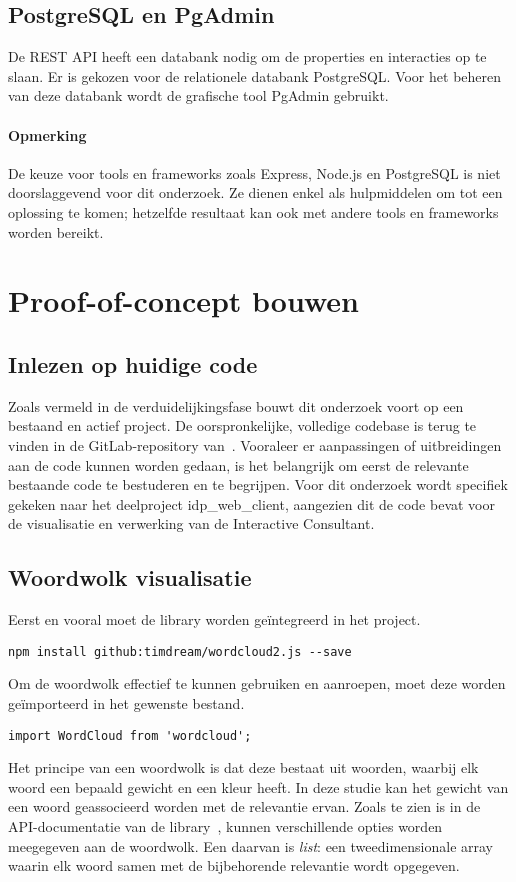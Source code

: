 \subsection{PostgreSQL en PgAdmin}
De REST API heeft een databank nodig om de properties en interacties op te slaan. Er is gekozen voor de relationele databank PostgreSQL. Voor het beheren van deze databank wordt de grafische tool PgAdmin gebruikt.

\paragraph{Opmerking}
De keuze voor tools en frameworks zoals Express, Node.js en PostgreSQL is niet doorslaggevend voor dit onderzoek. Ze dienen enkel als hulpmiddelen om tot een oplossing te komen; hetzelfde resultaat kan ook met andere tools en frameworks worden bereikt.

\section{Proof-of-concept bouwen}
\subsection{Inlezen op huidige code}
Zoals vermeld in de verduidelijkingsfase bouwt dit onderzoek voort op een bestaand en actief project. De oorspronkelijke, volledige codebase is terug te vinden in de GitLab-repository van~\textcite{Carbonnelle2019}. Vooraleer er aanpassingen of uitbreidingen aan de code kunnen worden gedaan, is het belangrijk om eerst de relevante bestaande code te bestuderen en te begrijpen. Voor dit onderzoek wordt specifiek gekeken naar het deelproject idp\_web\_client, aangezien dit de code bevat voor de visualisatie en verwerking van de Interactive Consultant.

\subsection{Woordwolk visualisatie}
Eerst en vooral moet de library worden geïntegreerd in het project.
\begin{verbatim}npm install github:timdream/wordcloud2.js --save\end{verbatim}
Om de woordwolk effectief te kunnen gebruiken en aanroepen, moet deze worden geïmporteerd in het gewenste bestand.
\begin{verbatim}import WordCloud from 'wordcloud';\end{verbatim}
Het principe van een woordwolk is dat deze bestaat uit woorden, waarbij elk woord een bepaald gewicht en een kleur heeft. In deze studie kan het gewicht van een woord geassocieerd worden met de relevantie ervan. Zoals te zien is in de API-documentatie van de library~\autocite{Chien2011}, kunnen verschillende opties worden meegegeven aan de woordwolk. Een daarvan is \textit{list}: een tweedimensionale array waarin elk woord samen met de bijbehorende relevantie wordt opgegeven.

